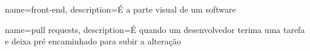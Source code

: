 \makeglossaries

{
    name=front-end,
    description={É a parte visual de um software}
}

{
    name=pull requests,
    description={É quando um desenvolvedor terima uma tarefa e deixa pré encaminhado para subir a alteração}
}

